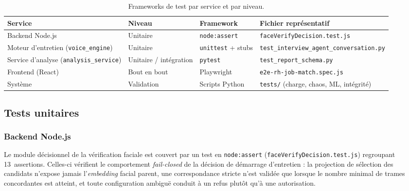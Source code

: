 \begin{table}[H]
  \centering
  \footnotesize
  \renewcommand{\arraystretch}{1.3}
  \setlength{\tabcolsep}{5pt}
  \begin{tabularx}{\textwidth}{|>{\raggedright\arraybackslash}p{3.4cm}|>{\raggedright\arraybackslash}p{2.3cm}|>{\raggedright\arraybackslash}p{3.0cm}|>{\raggedright\arraybackslash}X|}
    \hline
    \rowcolor{blue!10}
    \textbf{Service} & \textbf{Niveau} & \textbf{Framework} & \textbf{Fichier représentatif} \\
    \hline
    Backend Node.js & Unitaire & \texttt{node:assert} & \texttt{faceVerifyDecision.test.js} \\
    \hline
    Moteur d'entretien (\texttt{voice\_engine}) & Unitaire & \texttt{unittest} + stubs & \texttt{test\_interview\_agent\_conversation.py} \\
    \hline
    Service d'analyse (\texttt{analysis\_service}) & Unitaire / intégration & \texttt{pytest} & \texttt{test\_report\_schema.py} \\
    \hline
    Frontend (React) & Bout en bout & Playwright & \texttt{e2e-rh-job-match.spec.js} \\
    \hline
    Système & Validation & Scripts Python & \texttt{tests/} (charge, chaos, ML, intégrité) \\
    \hline
  \end{tabularx}
  \caption{Frameworks de test par service et par niveau.}
  \label{tab:test-frameworks}
\end{table}

\subsection{Tests unitaires}

\subsubsection{Backend Node.js}

Le module décisionnel de la vérification faciale est couvert par un test en
\texttt{node:assert} (\texttt{faceVerifyDecision.test.js}) regroupant 13~assertions. Celles-ci
vérifient le comportement \textit{fail-closed} de la décision de démarrage d'entretien :
la projection de sélection des candidats n'expose jamais l'\textit{embedding} facial parent,
une correspondance stricte n'est validée que lorsque le nombre minimal de trames concordantes
est atteint, et toute configuration ambiguë conduit à un refus plutôt qu'à une autorisation.

